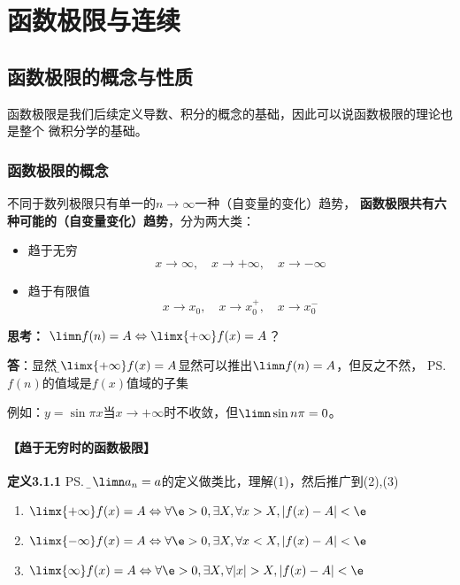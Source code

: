 \setcounter{chapter}{2}

\chapter{函数极限与连续}

\section{函数极限的概念与性质}

函数极限是我们后续定义导数、积分的概念的基础，因此可以说函数极限的理论也是整个
微积分学的基础。

\subsection{函数极限的概念}

不同于数列极限只有单一的$n\to\infty$一种（自变量的变化）趋势，
{\bf 函数极限共有六种可能的（自变量变化）趋势}，分为两大类：

\begin{itemize}
  \setlength{\itemindent}{1cm}
  \item 趋于无穷
  $$x\to\infty,\quad x\to+\infty,\quad x\to-\infty$$
  \item 趋于有限值
  $$x\to x_0,\quad x\to x_0^+,\quad x\to x_0^-$$
\end{itemize}

{\bf 思考：} $\limn f(n)=A\Leftrightarrow\limx{+\infty}f(x)=A$？

{\bf 答}：显然，{\b$\limx{+\infty}f(x)=A$显然可以推出$\limn f(n)=A$，但反之不然}，
\ps{$f(n)$的值域是$f(x)$值域的子集}

例如：$y=\sin\pi x$当$x\to+\infty$时不收敛，但$\limn\sin n\pi=0$。

\subsubsection{【趋于无穷时的函数极限】}

{\bf 定义3.1.1}
\ps{\b 和$\limn a_n=a$的定义做类比，理解(1)，然后推广到(2),(3)}
\begin{enumerate}[(1)]
  \setlength{\itemindent}{1cm}
  \item $\limx{+\infty}f(x)=A\Leftrightarrow\forall \e>0,\exists X,\forall
  x>X,|f(x)-A|<\e$
  \item $\limx{-\infty}f(x)=A\Leftrightarrow\forall \e>0,\exists X,\forall
  x<X,|f(x)-A|<\e$
  \item $\limx{\infty}f(x)=A\Leftrightarrow\forall \e>0,\exists X,\forall
  |x|>X,|f(x)-A|<\e$
\end{enumerate}

